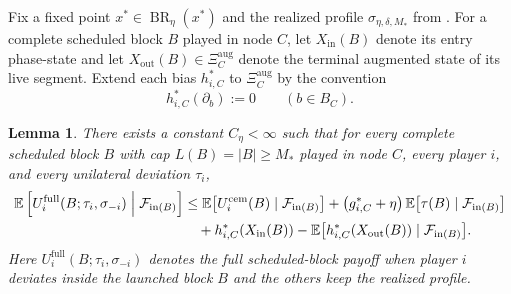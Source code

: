 \documentclass[12pt]{article}
\newtheorem{lemma}[theorem]{Lemma}
\theoremstyle{definition}
\newcommand{\E}{\mathbb{E}}
\newcommand{\1}{\mathbf{1}}
\newcommand{\cF}{\mathcal{F}}
\DeclareMathOperator{\BR}{BR}
\begin{document}
Fix a fixed point $x^*\in\BR_\eta(x^*)$ and the realized profile
$\sigma_{\eta,\delta,M_*}$ from . For a complete scheduled
block $B$ played in node $C$, let $X_{\mathrm{in}}(B)$ denote its entry
phase-state and let $X_{\mathrm{out}}(B)\in\Xi_C^{\mathrm{aug}}$ denote the
terminal augmented state of its live segment. Extend each bias $h_{i,C}^*$ to
$\Xi_C^{\mathrm{aug}}$ by the convention
\[
h_{i,C}^*(\partial_b):=0
\qquad (b\in B_C).
\]

\begin{lemma}
\label{lem:block-bellman}
There exists a constant $C_\eta<\infty$ such that for every complete scheduled
block $B$ with cap $L(B)=|B|\ge M_*$ played in node $C$, every player $i$, and
every unilateral deviation $\tau_i$,
\begin{equation}
\label{eq:block-bellman-ineq}
\begin{aligned}
\E\left[
U_i^{\mathrm{full}}(B;\tau_i,\sigma_{-i})
\Bigm|\cF_{\mathrm{in}(B)}
\right]
&\le
\E\bigl[U_i^{\mathrm{cem}}(B)\mid\cF_{\mathrm{in}(B)}\bigr]
+
\bigl(g_{i,C}^*+\eta\bigr)\,
\E\bigl[\tau(B)\mid\cF_{\mathrm{in}(B)}\bigr]
\\
&\quad+
h_{i,C}^*(X_{\mathrm{in}}(B))
-
\E\bigl[h_{i,C}^*(X_{\mathrm{out}}(B))\mid\cF_{\mathrm{in}(B)}\bigr].
\end{aligned}
\end{equation}
Here $U_i^{\mathrm{full}}(B;\tau_i,\sigma_{-i})$ denotes the full
scheduled-block payoff when player $i$ deviates inside the launched block $B$
and the others keep the realized profile.
\end{lemma}
\end{document}
